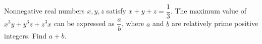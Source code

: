 Nonnegative real numbers $x,y,z$ satisfy $x+y+z=\dfrac{1}{3}$. The maximum value of $x^3y+y^3z+z^3x$ can be expressed as $\dfrac{a}{b}$, where $a$ and $b$ are relatively prime positive integers. Find $a+b$.
